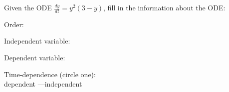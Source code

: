 \documentclass[10pt,twoside,sfsidenotes]{tufte-handout}
\begin{document}


\begin{fullwidth}
  \begin{question} %
    Given the ODE \quad \(\displaystyle \frac{dy}{dt} = y^{2}(3-y)\), fill in the information about the ODE:

    \begin{colenumerate}[2]
      \item Order: \blank[width=0.5in]{}
      \item Independent variable: \blank[width=0.5in]{}
      \item Dependent variable: \blank[width=0.5in]{}
      \item Time-dependence (circle one): \\ dependent \quad---\quad independent
    \end{colenumerate}
  \end{question}
\end{fullwidth}
\end{document}
